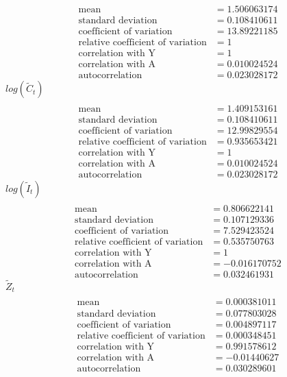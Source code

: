 \documentclass[letterpaper,12pt]{article}
\theoremstyle{definition}
\begin{document}
\begin{align*}
\\\text{mean} &= 1.506063174
\\\text{standard deviation} &=	0.108410611
\\\text{coefficient of variation}&=	13.89221185
\\\text{relative coefficient of variation}&=1
\\\text{correlation with Y}&=1
\\\text{correlation with A}&=	0.010024524
\\\text{autocorrelation}&=	0.023028172
\end{align*}
$log(\tilde{C}_t)$
\begin{align*}
\\\text{mean} &= 1.409153161
\\\text{standard deviation} &= 0.108410611
\\\text{coefficient of variation}&=12.99829554
\\\text{relative coefficient of variation}&=0.935653421
\\\text{correlation with Y}&=1
\\\text{correlation with A}&=0.010024524
\\\text{autocorrelation}&=0.023028172
\end{align*}
$log(\tilde{I}_t)$
\begin{align*}
\\\text{mean} &= 0.806622141
\\\text{standard deviation} &= 0.107129336
\\\text{coefficient of variation}&=7.529423524
\\\text{relative coefficient of variation}&=0.535750763
\\\text{correlation with Y}&=1
\\\text{correlation with A}&=-0.016170752
\\\text{autocorrelation}&=0.032461931
\end{align*}
$\tilde{Z}_t$
\begin{align*}
\\\text{mean} &= 0.000381011
\\\text{standard deviation} &= 0.077803028
\\\text{coefficient of variation}&=0.004897117
\\\text{relative coefficient of variation}&=0.000348451
\\\text{correlation with Y}&=0.991578612
\\\text{correlation with A}&=-0.01440627
\\\text{autocorrelation}&=0.030289601
\end{align*}
\end{document}
